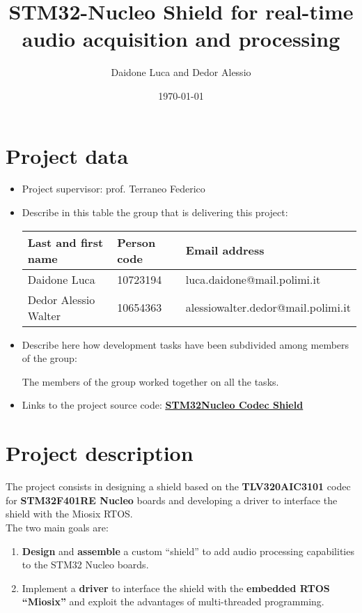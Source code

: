 \documentclass[10pt,a4]{article}
\author{Daidone Luca and Dedor Alessio}
\date{\today}
\title{\textbf{STM32-Nucleo Shield for real-time audio acquisition and processing}}
\begin{document}
\maketitle
\tableofcontents


\pagebreak

\section{Project data}

\begin{itemize}
\item 
  Project supervisor: prof. Terraneo Federico

\item 
Describe in this table the group that is delivering this project:

\begin{center}
\begin{tabular}{lll}
Last and first name & Person code & Email address\\
\hline
  Daidone Luca & 10723194 & luca.daidone@mail.polimi.it \\
  Dedor Alessio Walter & 10654363 & alessiowalter.dedor@mail.polimi.it                    
\end{tabular}
\end{center}

\item
Describe here how development tasks have been subdivided among members
of the group:

The members of the group worked together on all the tasks.

\item Links to the project source code:     \href{https://github.com/AleDedor/STM32Nucleo-Codec-Shield}{\textbf{\underline{STM32Nucleo Codec Shield}}}

\end{itemize}

\section{Project description}
The project consists in designing a shield based on the \textbf{TLV320AIC3101} codec for \textbf{STM32F401RE Nucleo} boards and developing a driver to interface the shield with the Miosix RTOS.\\

The two main goals are:
\begin{enumerate}
    \item \textbf{Design} and \textbf{assemble} a custom “shield” to add audio processing capabilities to the STM32 Nucleo boards.
    \item Implement a \textbf{driver} to interface the shield with the \textbf{embedded RTOS “Miosix”} and exploit the advantages of multi-threaded programming.
\end{enumerate}
\end{document}
